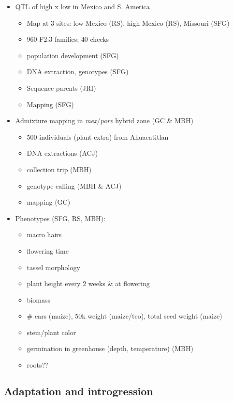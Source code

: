 \documentclass[]{article}
\begin{document}
	\begin{itemize}
		\item QTL of high x low in Mexico and S. America
		\begin{itemize}
			\item Map at 3 sites: low Mexico (RS), high Mexico (RS), Missouri (SFG)
			\item 960 F2:3 families; 40 checks
			\item population development (SFG)
			\item DNA extraction, genotypes (SFG)
			\item Sequence parents (JRI)
			\item Mapping (SFG)
		\end{itemize}	
		
		\item Admixture mapping in \emph{mex}/\emph{parv} hybrid zone (GC \& MBH)
		\begin{itemize}
			\item 500 individuals (plant extra) from Ahuacatitlan
			\item DNA extractions (ACJ)
			\item collection trip (MBH)
			\item genotype calling (MBH \& ACJ)
			\item mapping (GC)
		\end{itemize}
		\item Phenotypes (SFG, RS, MBH):
		\begin{itemize}
				\item macro hairs
				\item flowering time
				\item tassel morphology
				\item plant height every 2 weeks \& at flowering
				\item biomass
				\item \# ears (maize), 50k weight (maize/teo), total seed weight (maize)
				\item stem/plant color
				\item germination in greenhouse (depth, temperature) (MBH)
				\item roots??
		\end{itemize}
	\end{itemize}

\subsection{Adaptation and introgression}
\end{document}

